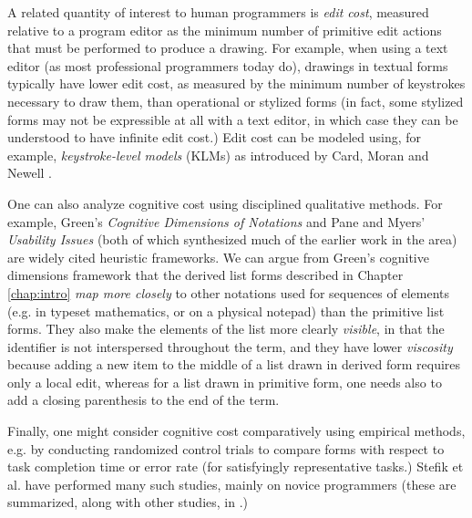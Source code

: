 A related quantity of interest to human programmers is \emph{edit cost}, measured relative to a program editor as the minimum number of primitive edit actions that must be performed to produce a drawing. For example, when using a text editor (as most professional programmers today do), drawings in textual forms typically have lower edit cost, as measured by the minimum number of keystrokes necessary to draw them, than operational or stylized forms (in fact, some stylized forms may not be expressible at all with a text editor, in which case they can be understood to have infinite edit cost.) Edit cost can be modeled using, for example, \emph{keystroke-level models} (KLMs) as introduced by Card, Moran and Newell \cite{journals/cacm/CardMN80}.%

One can also analyze cognitive cost using disciplined qualitative methods. For example, Green's \emph{Cognitive Dimensions of Notations} \cite{Green89,green1996usability} and Pane and Myers' \emph{Usability Issues} \cite{pane1996usability} (both of which synthesized much of the earlier work in the area) are widely cited heuristic frameworks. We can argue from Green's cognitive dimensions framework that the derived list forms described in Chapter \ref{chap:intro} \emph{map more closely} to other notations used for sequences of elements (e.g. in typeset mathematics, or on a physical notepad) than the primitive list forms. They also make the elements of the list more clearly \emph{visible}, in that the identifier  is not interspersed throughout the term, and they have lower \emph{viscosity} because adding a new item to the middle of a list drawn in derived form requires only a local edit, whereas for a list drawn in primitive form, one needs also to add a closing parenthesis to the end of the term.

Finally, one might consider cognitive cost comparatively using empirical methods, e.g. by conducting randomized control trials to compare forms with respect to task completion time or error rate (for satisfyingly representative tasks.) Stefik et al. have performed many such studies, mainly on novice programmers (these are summarized, along with other studies, in \cite{journals/jeric/StefikS13}.)


